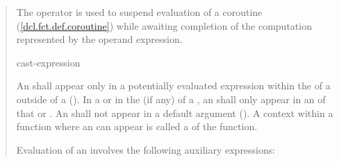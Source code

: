 \begin{quote}
\pnum
The  operator is used to suspend evaluation of a 
coroutine (\ref{dcl.fct.def.coroutine}) while awaiting completion of the computation represented by the operand expression.

\begin{bnf}
  \br
   cast-expression
\end{bnf}

\pnum
An  shall appear only in a potentially evaluated expression within the  of a  
 outside of a  (). In a  or in the  (if any) of a , an  shall only appear in an  of that  or .
An  shall not appear in a default argument (). A context within a function where an  can appear is called a  of the function.

\pnum
Evaluation of an  involves the following auxiliary expressions:

\begin{itemize}
	
  

\end{itemize}
\end{quote}
